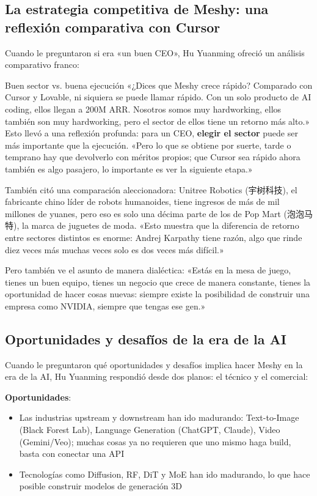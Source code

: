 \subsection{La estrategia competitiva de Meshy: una reflexión comparativa con Cursor}

Cuando le preguntaron si era «un buen CEO», Hu Yuanming ofreció un análisis comparativo franco:

\begin{knowledgebox}{Buen sector vs. buena ejecución}
«¿Dices que Meshy crece rápido? Comparado con Cursor y Lovable, ni siquiera se puede llamar rápido. Con un solo producto de AI coding, ellos llegan a 200M ARR. Nosotros somos muy hardworking, ellos también son muy hardworking, pero el sector de ellos tiene un retorno más alto.» Esto llevó a una reflexión profunda: para un CEO, \textbf{elegir el sector} puede ser más importante que la ejecución. «Pero lo que se obtiene por suerte, tarde o temprano hay que devolverlo con méritos propios; que Cursor sea rápido ahora también es algo pasajero, lo importante es ver la siguiente etapa.»
\end{knowledgebox}

También citó una comparación aleccionadora: Unitree Robotics (宇树科技), el fabricante chino líder de robots humanoides, tiene ingresos de más de mil millones de yuanes, pero eso es solo una décima parte de los de Pop Mart (泡泡马特), la marca de juguetes de moda. «Esto muestra que la diferencia de retorno entre sectores distintos es enorme: Andrej Karpathy tiene razón, algo que rinde diez veces más muchas veces solo es dos veces más difícil.»

Pero también ve el asunto de manera dialéctica: «Estás en la mesa de juego, tienes un buen equipo, tienes un negocio que crece de manera constante, tienes la oportunidad de hacer cosas nuevas: siempre existe la posibilidad de construir una empresa como NVIDIA, siempre que tengas ese gen.»

\subsection{Oportunidades y desafíos de la era de la AI}

Cuando le preguntaron qué oportunidades y desafíos implica hacer Meshy en la era de la AI, Hu Yuanming respondió desde dos planos: el técnico y el comercial:

\textbf{Oportunidades}:
\begin{itemize}
\item Las industrias upstream y downstream han ido madurando: Text-to-Image (Black Forest Lab), Language Generation (ChatGPT, Claude), Video (Gemini/Veo); muchas cosas ya no requieren que uno mismo haga build, basta con conectar una API
\item Tecnologías como Diffusion, RF, DiT y MoE han ido madurando, lo que hace posible construir modelos de generación 3D
\end{itemize}

